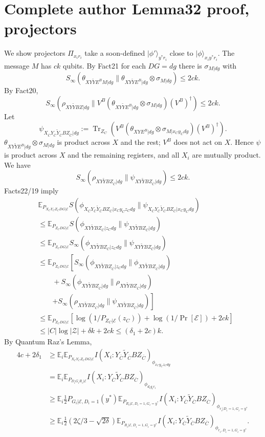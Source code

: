 \documentclass[10pt,a4paper]{article}
\providecommand{\ket}[1]{\lvert#1\rangle}
\providecommand{\QBobRest}{Y_{\overline C}\widetilde Y_{\overline C}BZ_{\overline C}}
\begin{document}
\section*{Complete author Lemma32 proof, projectors}
We show projectors $\Pi_{x_ir_i}$ take a soon-defined $\ket{\phi'}_{y^*r_i}$ close to $\ket\phi_{x_iy^*r_i}$. The message $M$ has $ck$ qubits. By Fact21 for each $DG=dg$ there is $\sigma_{M|dg}$ with
\[S_\infty(\theta_{XY\widetilde YE^BM|dg}\|\theta_{XY\widetilde YE^B|dg}\otimes\sigma_{M|dg})\le2ck.\]
By Fact20,
\[S_\infty(\rho_{XY\widetilde YBZ|dg}\|V^B(\theta_{XY\widetilde YE^B|dg}\otimes\sigma_{M|dg})(V^B)^\dagger)\le2ck.\]
Let
\[\psi_{X_{\overline C}\QBobRest|dg}:=\operatorname{Tr}_{Z_C}\left(V^B(\theta_{XYE^B|dg}\otimes\sigma_{M|x_Cy_Cdg})(V^B)^\dagger\right).\]
$\theta_{XY\widetilde YE^B|dg}\otimes\sigma_{M|dg}$ is product across $X$ and the rest; $V^B$ does not act on $X$. Hence $\psi$ is product across $X$ and the remaining registers, and all $X_i$ are mutually product. We have
\[S_\infty(\rho_{XY\widetilde YBZ_{\overline C}|dg}\|\psi_{XY\widetilde YBZ_{\overline C}|dg})\le2ck.\]
Facts22/19 imply
\begin{align*}&\mathbb E_{P_{X_CY_CZ_CDG|\mathcal E}}S(\phi_{X_{\overline C}\QBobRest|x_Cy_Cz_Cdg}\|\psi_{X_{\overline C}\QBobRest|x_Cy_Cdg})\\&\le\mathbb E_{P_{Z_CDG|\mathcal E}}S(\phi_{XY\widetilde YBZ_{\overline C}|z_Cdg}\|\psi_{XY\widetilde YBZ_{\overline C}|dg})\\&\le\mathbb E_{P_{Z_CDG|\mathcal E}}S_\infty(\phi_{XY\widetilde YBZ_{\overline C}|z_Cdg}\|\psi_{XY\widetilde YBZ_{\overline C}|dg})\\&\le\mathbb E_{P_{Z_CDG|\mathcal E}}\left[S_\infty(\phi_{XY\widetilde YBZ_{\overline C}|z_Cdg}\|\phi_{XY\widetilde YBZ_{\overline C}|dg})\right.\\&\qquad+S_\infty(\phi_{XY\widetilde YBZ_{\overline C}|dg}\|\rho_{XY\widetilde YBZ_{\overline C}|dg})\\&\qquad\left.+S_\infty(\rho_{XY\widetilde YBZ_{\overline C}|dg}\|\psi_{XY\widetilde YBZ_{\overline C}|dg})\right]\\&\le\mathbb E_{P_{Z_CDG|\mathcal E}}[\log(1/P_{Z_C|\mathcal E}(z_C))+\log(1/\Pr[\mathcal E])+2ck]\\&\le|C|\log|\mathcal Z|+\delta k+2ck\le(\delta_1+2c)k.
\end{align*}
By Quantum Raz's Lemma,
\begin{align*}4c+2\delta_1&\ge\mathbb E_i\mathbb E_{P_{X_CY_CZ_CDG|\mathcal E}}I(X_i:\QBobRest)_{\phi_{x_Cy_Cz_Cdg}}\\&=\mathbb E_i\mathbb E_{P_{D_iG_iR_i|\mathcal E}}I(X_i:\QBobRest)_{\phi_{d_ig_ir_i}}\\&\ge\mathbb E_i\tfrac12P_{G_i|\mathcal E,D_i=1}(y^*)\mathbb E_{P_{R_i|\mathcal E,D_i=1,G_i=y^*}}I(X_i:\QBobRest)_{\phi_{r_i|D_i=1,G_i=y^*}}\\&\ge\mathbb E_i\tfrac12(2\zeta/3-\sqrt{2\delta})\mathbb E_{P_{R_i|\mathcal E,D_i=1,G_i=y^*}}I(X_i:\QBobRest)_{\phi_{r_i,D_i=1,G_i=y^*}}.\tag{14}\end{align*}
\end{document}
